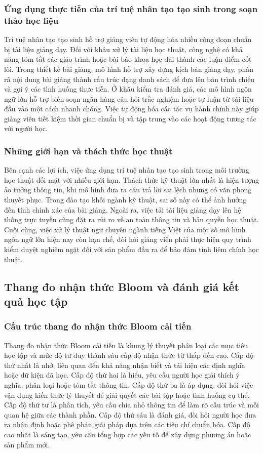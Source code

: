 \subsubsection{Ứng dụng thực tiễn của trí tuệ nhân tạo tạo sinh trong soạn thảo học liệu}
Trí tuệ nhân tạo tạo sinh hỗ trợ giảng viên tự động hóa nhiều công đoạn chuẩn bị tài liệu giảng dạy. Đối với khâu xử lý tài liệu học thuật, công nghệ có khả năng tóm tắt các giáo trình hoặc bài báo khoa học dài thành các luận điểm cốt lõi. Trong thiết kế bài giảng, mô hình hỗ trợ xây dựng kịch bản giảng dạy, phân rã nội dung bài giảng thành cấu trúc dạng danh sách để đưa lên bản trình chiếu và gợi ý các tình huống thực tiễn. Ở khâu kiểm tra đánh giá, các mô hình ngôn ngữ lớn hỗ trợ biên soạn ngân hàng câu hỏi trắc nghiệm hoặc tự luận từ tài liệu đầu vào một cách nhanh chóng. Việc tự động hóa các tác vụ hành chính này giúp giảng viên tiết kiệm thời gian chuẩn bị và tập trung vào các hoạt động tương tác với người học.

\subsubsection{Những giới hạn và thách thức học thuật}
Bên cạnh các lợi ích, việc ứng dụng trí tuệ nhân tạo tạo sinh trong môi trường học thuật đối mặt với nhiều giới hạn. Thách thức kỹ thuật lớn nhất là hiện tượng ảo tưởng thông tin, khi mô hình đưa ra câu trả lời sai lệch nhưng có văn phong thuyết phục. Trong đào tạo khối ngành kỹ thuật, sai số này có thể ảnh hưởng đến tính chính xác của bài giảng. Ngoài ra, việc tải tài liệu giảng dạy lên hệ thống trực tuyến cũng đặt ra rủi ro về an toàn thông tin và bản quyền học thuật. Cuối cùng, việc xử lý thuật ngữ chuyên ngành tiếng Việt của một số mô hình ngôn ngữ lớn hiện nay còn hạn chế, đòi hỏi giảng viên phải thực hiện quy trình kiểm duyệt nghiêm ngặt đối với sản phẩm đầu ra để bảo đảm tính liêm chính học thuật.

\subsection{Thang đo nhận thức Bloom và đánh giá kết quả học tập}

\subsubsection{Cấu trúc thang đo nhận thức Bloom cải tiến}
Thang đo nhận thức Bloom cải tiến là khung lý thuyết phân loại các mục tiêu học tập và mức độ tư duy thành sáu cấp độ nhận thức từ thấp đến cao. Cấp độ thứ nhất là nhớ, liên quan đến khả năng nhận biết và tái hiện các định nghĩa hoặc dữ kiện đã học. Cấp độ thứ hai là hiểu, yêu cầu người học giải thích ý nghĩa, phân loại hoặc tóm tắt thông tin. Cấp độ thứ ba là áp dụng, đòi hỏi việc vận dụng kiến thức lý thuyết để giải quyết các bài tập hoặc tình huống cụ thể. Cấp độ thứ tư là phân tích, yêu cầu chia nhỏ thông tin để làm rõ cấu trúc và mối quan hệ giữa các thành phần. Cấp độ thứ sáu là đánh giá, đòi hỏi người học đưa ra nhận định hoặc phê phán giải pháp dựa trên các tiêu chí chuẩn hóa. Cấp độ cao nhất là sáng tạo, yêu cầu tổng hợp các yếu tố để xây dựng phương án hoặc sản phẩm mới.

